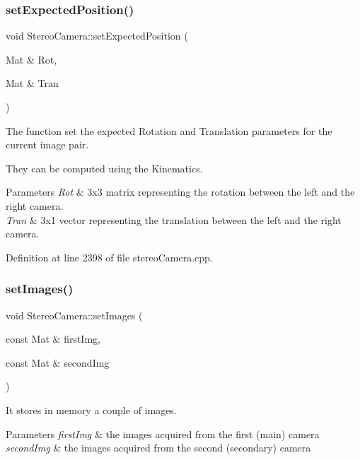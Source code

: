 \subsubsection{\texorpdfstring{setExpectedPosition()}{setExpectedPosition()}}
{\footnotesize\ttfamily void Stereo\+Camera\+::set\+Expected\+Position (\begin{DoxyParamCaption}\item[{Mat \&}]{Rot,  }\item[{Mat \&}]{Tran }\end{DoxyParamCaption})}



The function set the expected Rotation and Translation parameters for the current image pair. 

They can be computed using the Kinematics. 
\begin{DoxyParams}{Parameters}
{\em Rot} & 3x3 matrix representing the rotation between the left and the right camera. \\
\hline
{\em Tran} & 3x1 vector representing the translation between the left and the right camera. \\
\hline
\end{DoxyParams}


Definition at line 2398 of file stereo\+Camera.\+cpp.


\begin{DoxyCode}{0}

\end{DoxyCode}
\mbox{\label{classStereoCamera_adc36a2585c583219bddbb1c7fb0725df}} 
\subsubsection{\texorpdfstring{setImages()}{setImages()}}
{\footnotesize\ttfamily void Stereo\+Camera\+::set\+Images (\begin{DoxyParamCaption}\item[{const Mat \&}]{first\+Img,  }\item[{const Mat \&}]{second\+Img }\end{DoxyParamCaption})}



It stores in memory a couple of images. 


\begin{DoxyParams}{Parameters}
{\em first\+Img} & the images acquired from the first (main) camera \\
\hline
{\em second\+Img} & the images acquired from the second (secondary) camera \\
\hline
\end{DoxyParams}


